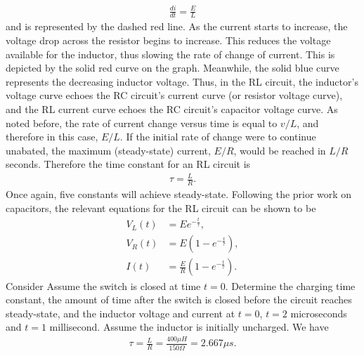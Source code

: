 \documentclass{report}
\begin{document}
\begin{itemize}
\begin{align*}
                \frac{di}{dt} = \frac{E}{L}
            \end{align*}
            and is represented by the dashed red line. As the current starts to increase, the voltage drop across the resistor begins to increase. This reduces the voltage available for the inductor, thus slowing the rate of change of current. This is depicted by the solid red curve on the graph.
            \bigbreak \noindent 
            Meanwhile, the solid blue curve represents the decreasing inductor voltage. Thus, in the RL circuit, the inductor's voltage curve echoes the RC circuit's current curve (or resistor voltage curve), and the RL current curve echoes the RC circuit's capacitor voltage curve.
            \bigbreak \noindent 
            \bigbreak \noindent 
            As noted before, the rate of current change versus time is equal to $v/L$, and therefore in this case, $E/L$. If the initial rate of change were to continue unabated, the maximum (steady-state) current, $E/R$, would be reached in $L/R$ seconds. Therefore the time constant for an RL circuit is
            \begin{align*}
                \tau = \frac{L}{R}
            .\end{align*}
            Once again, five constants will achieve steady-state. Following the prior work on capacitors, the relevant equations for the RL circuit can be shown to be
            \begin{align*}
                V_{L}(t) &= Ee^{-\frac{t}{\tau}}, \\
                V_{R}(t) &= E\left(1-e^{-\frac{t}{\tau}}\right), \\
                I(t) &= \frac{E}{R}\left(1-e^{-\frac{t}{\tau}}\right)
            .\end{align*}
            \bigbreak \noindent 
            Consider
            \bigbreak \noindent 
            \bigbreak \noindent 
            Assume the switch is closed at time $t = 0$. Determine the charging time constant, the amount of time after the switch is closed before the circuit reaches steady-state, and the inductor voltage and current at $t = 0$, $t = 2$ microseconds and $t = 1$ millisecond. Assume the inductor is initially uncharged.
            \bigbreak \noindent 
            We have
            \begin{align*}
                \tau = \frac{L}{R} = \frac{400\mu H}{150\Omega} = 2.667\mu s
            .\end{align*}

\end{itemize}
\end{document}
